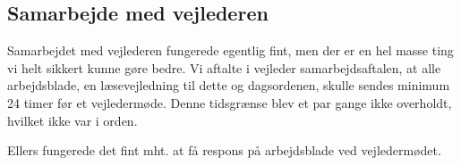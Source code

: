 \subsection{Samarbejde med vejlederen}

Samarbejdet med vejlederen fungerede egentlig fint, men der er en hel masse ting vi helt sikkert kunne gøre bedre. Vi aftalte i vejleder samarbejdsaftalen, at alle arbejdsblade, en læsevejledning til dette og dagsordenen, skulle sendes minimum 24 timer før et vejledermøde. Denne tidsgrænse blev et par gange ikke overholdt, hvilket ikke var i orden. 


Ellers fungerede det fint mht. at få respons på arbejdsblade ved vejledermødet.